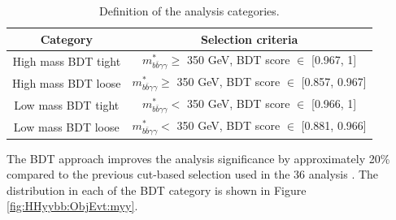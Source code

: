\begin{table}[htbp]
    \centering
    \begin{tabular}{cc}
    \hline\hline
        Category & Selection criteria \\
    \hline
    High mass BDT tight & $m_{b \bar{b} \gamma \gamma}^{*} \geq$ 350 GeV, BDT score $\in$ [0.967, 1] \\
    High mass BDT loose & $m_{b \bar{b} \gamma \gamma}^{*} \geq$ 350 GeV, BDT score $\in$ [0.857, 0.967] \\
    Low mass BDT tight & $m_{b \bar{b} \gamma \gamma}^{*} <$ 350 GeV, BDT score $\in$ [0.966, 1] \\
    Low mass BDT loose & $m_{b \bar{b} \gamma \gamma}^{*} <$ 350 GeV, BDT score $\in$ [0.881, 0.966] \\
     \hline\hline
    \end{tabular}
    \caption{Definition of the analysis categories.}
    \label{tab:HHyybb:ObjEvt:Evt:Cat}
\end{table}
The BDT approach improves the analysis significance by approximately 20\% compared to the previous cut-based selection used in the 36 \ifb analysis \cite{yybb_36ifb}. The \myy distribution in each of the BDT category is shown in Figure \ref{fig:HHyybb:ObjEvt:myy}. \\ 

